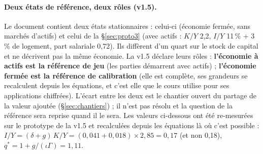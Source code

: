 \documentclass[11pt,a4paper]{article}
\begin{document}
\paragraph{Deux états de référence, deux rôles (v1.5).} Le document contient deux états stationnaires : celui-ci (économie fermée, sans marchés d'actifs) et celui de la \S\ref{sec:proto3} (avec actifs : $K/Y$ 2,2, $I/Y$ 11\,\% $+$ 3\,\% de logement, part salariale 0,72). Ils diffèrent d'un quart sur le stock de capital et ne décrivent pas la même économie. La v1.5 déclare leurs rôles : \textbf{l'économie à actifs est la référence de jeu} (les parties démarrent avec actifs) ; \textbf{l'économie fermée est la référence de calibration} (elle est complète, ses grandeurs se recalculent depuis les équations, et c'est elle que le cours utilise pour ses applications chiffrées). L'écart entre les deux est le chantier ouvert du partage de la valeur ajoutée (\S\ref{sec:chantiers}) ; il n'est pas résolu et la question de la référence sera reprise quand il le sera. Les valeurs ci-dessous ont été re-mesurées sur le prototype de la v1.5 et recalculées depuis les équations là où c'est possible : $I/Y=(\delta+g)\,K/Y=(0{,}041+0{,}018)\times2{,}85=0{,}17$ (et non 0,18), $q^\ast=1+g/(\iota\Gamma)=1{,}11$.
\end{document}
